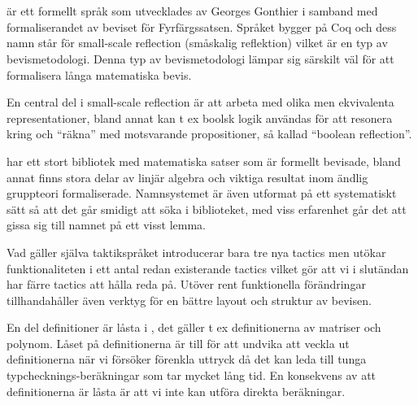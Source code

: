 \section{\ssr}
\ssr är ett formellt språk som utvecklades av Georges Gonthier i samband med
formaliserandet av beviset för Fyrfärgssatsen. Språket bygger på Coq och dess
namn står för small-scale reflection (småskalig reflektion) vilket är en typ av
bevismetodologi. Denna typ av bevismetodologi lämpar sig särskilt väl för att
formalisera långa matematiska bevis.

En central del i small-scale reflection är att arbeta med olika men ekvivalenta
representationer, bland annat kan t ex boolsk logik användas för att resonera
kring och ``räkna'' med motsvarande propositioner, så kallad ``boolean
reflection''.

\ssr har ett stort bibliotek med matematiska satser som är formellt bevisade,
bland annat finns stora delar av linjär algebra och viktiga resultat inom
ändlig gruppteori formaliserade. Namnsystemet är även utformat på ett
systematiskt sätt så att det går smidigt att söka i biblioteket, med viss
erfarenhet går det att gissa sig till namnet på ett visst lemma.

Vad gäller själva taktikspråket introducerar \ssr bara tre nya tactics men
utökar funktionaliteten i ett antal redan existerande tactics vilket gör att vi
i slutändan har färre tactics att hålla reda på. Utöver rent funktionella
förändringar tillhandahåller \ssr även verktyg för en bättre layout och
struktur av bevisen.

En del definitioner är låsta i \ssr, det gäller t ex definitionerna av matriser
och polynom. Låset på definitionerna är till för att undvika att veckla ut
definitionerna när vi försöker förenkla uttryck då det kan leda till tunga
typchecknings-beräkningar som tar mycket lång tid. En konsekvens av att
definitionerna är låsta är att vi inte kan utföra direkta beräkningar.
